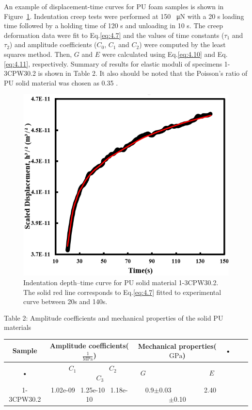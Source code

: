 \documentclass[review]{elsarticle}
\begin{document}
An example of displacement-time curves for PU foam samples is shown in Figure~\ref{fig:TimeDispNano}. Indentation creep tests were performed at 150 \SI{}{\micro\N} with a 20 s loading time followed by a holding time of 120 s and unloading in 10 s.  The creep deformation data were fit to Eq.\eqref{eq:4.7} and the values of time constants ($\tau_1$ and $\tau_2$) and amplitude coefficients ($C_0$, $C_1$ and $C_2$) were computed by the least squares method. Then, $G$ and $E$ were calculated using Eq.\ref{eq:4.10} and Eq.\ref{eq:4.11}, respectively. Summary of results for elastic moduli of specimens 1-3CPW30.2 is shown in Table 2. It also should be noted that the Poisson’s ratio of PU solid material  was chosen as 0.35 \cite{oyen2005}.
\begin{figure}[hb]
  \centering
  \includegraphics[scale=0.5]{TimeDispNano}
  \captionsetup{justification=centering}
  \caption[Close up of \textit{Hemidactylus} sp. ]
   {Indentation depth–time curve for PU solid material 1-3CPW30.2. The solid red line corresponds to Eq.\eqref{eq:4.7} fitted to experimental curve between 20s and 140s.}
  \label{fig:TimeDispNano}
\end{figure}

\begin{center}
Table 2: Amplitude coefficients and mechanical properties of the solid PU materials
\end{center}
\begin{center}
\begin{tabular}{cccccc}
\hline 
Sample & Amplitude coefficients($\displaystyle{\mathrm{\frac{1}{MPa}}}$) &  Mechanical properties($\mathrm{GPa}$) & • \\ 
\hline 
• & \ \ $C_1$ \ \ \ \ \ \ \ \ \ $C_2$ \ \ \ \ \ \ \ \ \ $C_3$ \ \ &$G$ \ \ \ \ \ \ \ \ \ \ \ \ \ \ \ \ \ \ $E$ \\ 
\hline 
1-3CPW30.2 &1.02e-09 \ 1.25e-10 \ 1.18e-10 & \ \ 0.9$\pm0.03$ \ \ \ \ \ \ \ \ \ 2.40$\pm$0.10 \\ 
\hline 
\end{tabular} 
\end{center}
\end{document}
